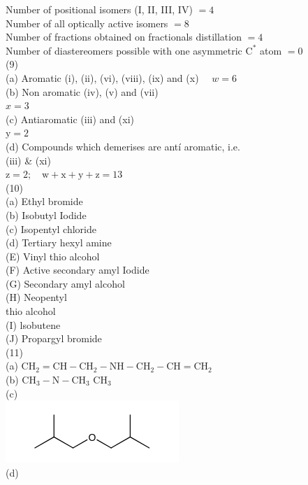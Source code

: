 \documentclass[10pt]{article}
\begin{document}
Number of positional isomers (I, II, III, IV) $=4$\\
Number of all optically active isomers $=8$\\
Number of fractions obtained on fractionals distillation $=4$\\
Number of diastereomers possible with one asymmetric $\mathrm{C}^{*}$ atom $=0$\\
(9)\\
(a) Aromatic (i), (ii), (vi), (viii), (ix) and (x) $\quad w=6$\\
(b) Non aromatic (iv), (v) and (vii)\\
$x=3$\\
(c) Antiaromatic (iii) and (xi)\\
$\mathrm{y}=2$\\
(d) Compounds which demerises are antí aromatic, i.e.\\
(iii) \& (xi)\\
$\mathrm{z}=2 ; \quad \mathrm{w}+\mathrm{x}+\mathrm{y}+\mathrm{z}=13$\\
(10)\\
(a) Ethyl bromide\\
(b) Isobutyl Iodide\\
(c) Isopentyl chloride\\
(d) Tertiary hexyl amine\\
(E) Vinyl thio alcohol\\
(F) Active secondary amyl Iodide\\
(G) Secondary amyl alcohol\\
(H) Neopentyl\\
thio alcohol\\
(I) lsobutene\\
(J) Propargyl bromide\\
(11)\\
(a) $\mathrm{CH}_{2}=\mathrm{CH}-\mathrm{CH}_{2}-\mathrm{NH}-\mathrm{CH}_{2}-\mathrm{CH}=\mathrm{CH}_{2}$\\
(b) $\mathrm{CH}_{3}-\mathrm{N}-\mathrm{CH}_{3}$ $\mathrm{CH}_{3}$\\
(c)\\
\includegraphics{smile-c8a4fda7780b4d88720bb2d7f4d43aa45b0f418e}\\
(d)\\
\end{document}
